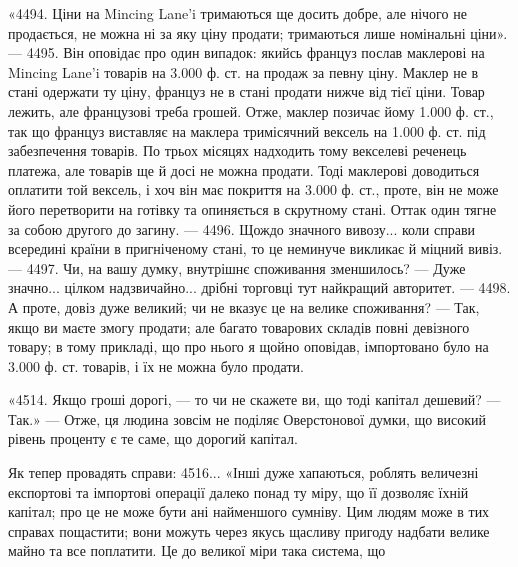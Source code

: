 «4494. Ціни на Mincing Lane’i тримаються ще досить добре, але нічого
не продається, не можна ні за яку ціну продати; тримаються лише номінальні
ціни». — 4495. Він оповідає про один випадок: якийсь француз послав маклерові
на Mincing Lane’i товарів на 3.000 ф. ст. на продаж за певну ціну. Маклер
не в стані одержати ту ціну, француз не в стані продати нижче від тієї
ціни. Товар лежить, але французові треба грошей. Отже, маклер позичає йому 1.000 ф. ст., так що
француз виставляє на маклера тримісячний вексель на 1.000 ф. ст. під забезпечення товарів. По трьох
місяцях надходить тому векселеві
реченець платежа, але товарів ще й досі не можна продати. Тоді маклерові
доводиться оплатити той вексель, і хоч він має покриття на 3.000 ф. ст.,
проте, він не може його перетворити на готівку та опиняється в скрутному
стані. Оттак один тягне за собою другого до загину. — 4496. Щождо значного
вивозу... коли справи всередині країни в пригніченому стані, то це неминуче
викликає й міцний вивіз. — 4497. Чи, на вашу думку, внутрішнє споживання зменшилось?
— Дуже значно... цілком надзвичайно... дрібні торговці тут
найкращий авторитет. — 4498. А проте, довіз дуже великий; чи не вказує це
на велике споживання? — Так, якщо ви маєте змогу продати; але багато
товарових складів повні девізного товару; в тому прикладі, що про нього я щойно
оповідав, імпортовано було на 3.000 ф. ст. товарів, і їх не можна було продати.

«4514. Якщо гроші дорогі, — то чи не скажете ви, що тоді капітал дешевий?
— Так.» — Отже, ця людина зовсім не поділяє Оверстонової думки, що
високий рівень проценту є те саме, що дорогий капітал.

Як тепер провадять справи: 4516... «Інші дуже хапаються, роблять
величезні експортові та імпортові операції далеко понад ту міру, що її дозволяє
їхній капітал; про це не може бути ані найменшого сумніву. Цим людям
може в тих справах пощастити; вони можуть через якусь щасливу пригоду
надбати велике майно та все поплатити. Це до великої міри така система, що
